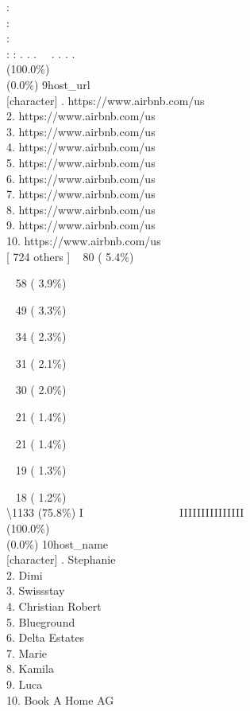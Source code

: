 \documentclass[
  journal,
]{IEEEtran}%
\begin{document}
:\\
:\\
:\\
: : . . . ~~. . . . \\
(100.0\%) \\
(0.0\%) \textbar{} \textbar{} 9\textbar host\_url\\
{[}character{]} . https://www.airbnb.com/us\\
2. https://www.airbnb.com/us\\
3. https://www.airbnb.com/us\\
4. https://www.airbnb.com/us\\
5. https://www.airbnb.com/us\\
6. https://www.airbnb.com/us\\
7. https://www.airbnb.com/us\\
8. https://www.airbnb.com/us\\
9. https://www.airbnb.com/us\\
10. https://www.airbnb.com/us\\
{[} 724 others {]} \textbar~ 80 ( 5.4\%)\\
\strut ~ 58 ( 3.9\%)\\
\strut ~ 49 ( 3.3\%)\\
\strut ~ 34 ( 2.3\%)\\
\strut ~ 31 ( 2.1\%)\\
\strut ~ 30 ( 2.0\%)\\
\strut ~ 21 ( 1.4\%)\\
\strut ~ 21 ( 1.4\%)\\
\strut ~ 19 ( 1.3\%)\\
\strut ~ 18 ( 1.2\%)\\
\textbackslash1133 (75.8\%) \textbar{} \textbar I ~ ~ ~ ~ ~ ~ ~ ~ ~ ~
IIIIIIIIIIIIIII \\
(100.0\%) \\
(0.0\%) \textbar{} \textbar{} 10\textbar host\_name\\
{[}character{]} . Stephanie\\
2. Dimi\\
3. Swissstay\\
4. Christian Robert\\
5. Blueground\\
6. Delta Estates\\
7. Marie\\
8. Kamila\\
9. Luca\\
10. Book A Home AG\\
\end{document}
